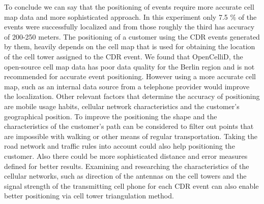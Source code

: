To conclude we can say that the positioning of events require more accurate cell map data and more sophisticated approach. In this experiment only 7.5 \% of the events were successfully localized and from those roughly the third has accuracy of 200-250 meters. 
The positioning of a customer using the CDR events generated by them, heavily depends on the cell map that is used for obtaining the location of the cell tower assigned to the CDR event. 
We found that OpenCelliD, the open-source cell map data has poor data quality for the Berlin region and is not recommended for accurate event positioning. 
However using a more accurate cell map, such as an internal data source from a telephone provider would improve the localization.
Other relevant factors that determine the accuracy of positioning are mobile usage habits, cellular network characteristics and the customer's geographical position.
To improve the positioning the shape and the characteristics of the customer's path can be considered to filter out points that are impossible with walking or other means of regular transportation. Taking the road network and traffic rules into account could also help positioning the customer. Also there could be more sophisticated distance and error measures defined for better results.
Examining and researching the characteristics of the cellular networks, such as direction of the antennas on the cell towers and the signal strength of the transmitting cell phone for each CDR event can also enable better positioning via cell tower triangulation method. 
